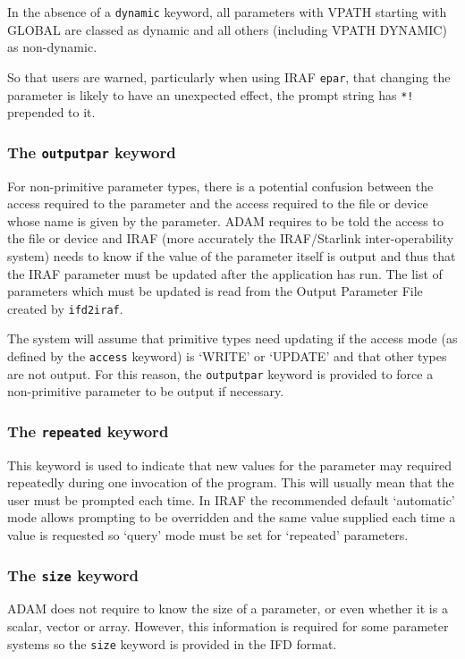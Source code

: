 \documentclass[twoside,11pt]{article}
\newcommand{\htmlref}[2]{#1}
\newcommand{\xlabel}[1]{}
\begin{document}
In the absence of a
\htmlref{\texttt{dynamic}}{dynamic} 
keyword, all parameters with VPATH starting with GLOBAL are classed as 
dynamic and all others (including VPATH DYNAMIC) as non-dynamic.

So that users are warned, particularly when using IRAF \texttt{epar}, that
changing the parameter is likely to have an unexpected effect, the prompt
string has \texttt{*!} prepended to it.

\subsubsection{\xlabel{the_outputpar_keyword}\label{outputpar_key}The 
\texttt{outputpar} keyword}
For non-primitive parameter types, there is a potential confusion between the
access required to the parameter and the access required to the file
or device whose name is given by the parameter. ADAM requires to be
told the access to the file or device and IRAF (more accurately the
IRAF/Starlink inter-operability system) needs to know if the value of
the parameter itself is output and thus that the IRAF parameter must
be updated after the application has run.
The list of parameters which must be updated is read from the Output Parameter
File created by \texttt{ifd2iraf}.

The system will assume that primitive types need updating if the access
mode (as defined by the 
\htmlref{\texttt{access}}{access}
keyword) is `WRITE' or `UPDATE' and that other types are not output.
For this reason, the 
\htmlref{\texttt{outputpar}}{outputpar}
keyword is provided to force a non-primitive parameter to be output if 
necessary.

\subsubsection{\xlabel{the_repeated_keyword}\label{repeated_key}The 
\texttt{repeated} keyword}
This keyword is used to indicate that new values for the parameter may 
required repeatedly during one invocation of the program. 
This will usually mean that the user must be prompted each time. In IRAF the
recommended default `automatic' mode allows prompting to be overridden and the
same value supplied each time a value is requested so `query' mode must be set
for `repeated' parameters.

\subsubsection{\xlabel{the_size_keyword}\label{size_key}The \texttt{size} 
keyword}
ADAM does not require to know the size of a parameter, or even whether it is
a scalar, vector or array.  However, this information is required for some
parameter systems so the
\htmlref{\texttt{size}}{size}
keyword is provided in the IFD format.
\end{document}
